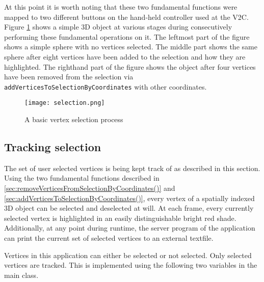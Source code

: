 At this point it is worth noting that these two fundamental functions were mapped to two different buttons on the hand-held controller used at the V2C. Figure \ref{fig:selection.png} shows a simple 3D object at various stages during consecutively performing these fundamental operations on it. The leftmost part of the figure shows a simple sphere with no vertices selected. The middle part shows the same sphere after eight vertices have been added to the selection and how they are highlighted. The righthand part of the figure shows the object after four vertices have been removed from the selection via \texttt{addVerticesToSelectionByCoordinates} with other coordinates.

\begin{figure}[htb]
  \centering
  \texttt{[image: selection.png]}
  \caption{A basic vertex selection process}\label{fig:selection.png}
\end{figure}


\subsection{Tracking selection}
\label{sec:tracking_selection}

The set of user selected vertices is being kept track of as described in this section. Using the two fundamental functions described in \ref{sec:removeVerticesFromSelectionByCoordinates()} and \ref{sec:addVerticesToSelectionByCoordinates()}, every vertex of a spatially indexed 3D object can be selected and deselected at will. At each frame, every currently selected vertex is highlighted in an easily distinguishable bright red shade. Additionally, at any point during runtime, the server program of the application can print the current set of selected vertices to an external textfile.

Vertices in this application can either be selected or not selected. Only selected vertices are tracked. This is implemented using the following two variables in the main class.

